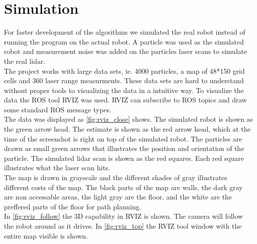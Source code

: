 
\section{Simulation} %
\label{sec:simulation}

For faster development of the algorithms we simulated the real robot instead of running the program on the actual robot. A particle was used as the simulated robot and measurement noise was added on the particles laser scans to simulate the real lidar. \\

The project works with large data sets, ie. 4000 particles, a map of 48*150 grid cells and 360 laser range measurments. These data sets are hard to understand without proper tools to visualizing the data in a intuitive way. To visualize the data the ROS tool RVIZ was used. RVIZ can subscribe to ROS topics and draw some standard ROS message types.\\

The data was displayed as \autoref{fig:rviz_close} shows. The simulated robot is shown as the green arrow head. The estimate is shown as the red arrow head, which at the time of the screenshot is right on top of the simulated robot. The particles are drawn as small green arrows that illustrates the position and orientation of the particle. The simulated lidar scan is shown as the red squares. Each red square illustrates what the laser scan hits.\\

The map is drawn in grayscale and the different shades of gray illustrates different costs of the map. The black parts of the map are walls, the dark gray are non accessable areas, the light gray are the floor, and the white are the preffered parts of the floor for path planning.\\

In \autoref{fig:rviz_follow} the 3D capability in RVIZ is shown. The camera will follow the robot around as it drives. In \autoref{fig:rviz_top} the RVIZ tool window with the entire map visible is shown.

